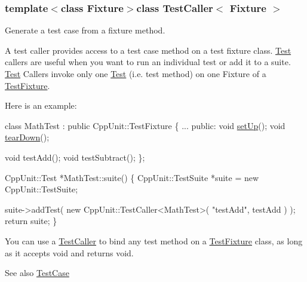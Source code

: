 \subsubsection*{template$<$class Fixture$>$class Test\+Caller$<$ Fixture $>$}

Generate a test case from a fixture method.

A test caller provides access to a test case method on a test fixture class. \hyperlink{class_test}{Test} callers are useful when you want to run an individual test or add it to a suite. \hyperlink{class_test}{Test} Callers invoke only one \hyperlink{class_test}{Test} (i.\+e. test method) on one Fixture of a \hyperlink{class_test_fixture}{Test\+Fixture}. 

Here is an example\+: 
\begin{DoxyCode}
\textcolor{keyword}{class }MathTest : \textcolor{keyword}{public} CppUnit::TestFixture \{
        ...
    \textcolor{keyword}{public}:
        \textcolor{keywordtype}{void}         \hyperlink{class_test_caller_ae6880afc711d24ae0b8846759064ceea}{setUp}();
        \textcolor{keywordtype}{void}         \hyperlink{class_test_caller_a0e463b88bf0ceacbd8875e0450ed2649}{tearDown}();

        \textcolor{keywordtype}{void}         testAdd();
        \textcolor{keywordtype}{void}         testSubtract();
\};

CppUnit::Test *MathTest::suite() \{
    CppUnit::TestSuite *suite = \textcolor{keyword}{new} CppUnit::TestSuite;

    suite->addTest( \textcolor{keyword}{new} CppUnit::TestCaller<MathTest>( \textcolor{stringliteral}{"testAdd"}, testAdd ) );
    \textcolor{keywordflow}{return} suite;
\}
\end{DoxyCode}


You can use a \hyperlink{class_test_caller}{Test\+Caller} to bind any test method on a \hyperlink{class_test_fixture}{Test\+Fixture} class, as long as it accepts void and returns void.

\begin{DoxySeeAlso}{See also}
\hyperlink{class_test_case}{Test\+Case} 
\end{DoxySeeAlso}


